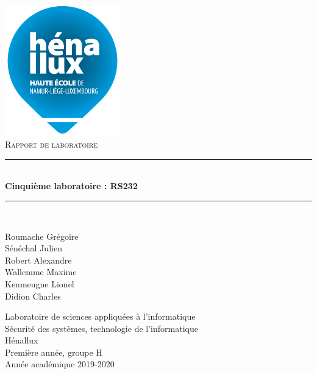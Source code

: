 \documentclass[a4paper]{article}
\newcommand{\HRule}{\rule{\linewidth}{0.5mm}}
\newcommand{\bgimg}[1]{
\AddToShipoutPicture
   {
      \put(\LenToUnit{0 cm},\LenToUnit{0 cm})
      {
            \texttt{[image: \#1]} 
      }
   }
}
\begin{document}

















\begin{titlepage}
    \begin{sffamily}
        \begin{center}
            \includegraphics[width=5cm]{images/LogoHenallux.PNG}~\\[1.5cm]
            \textsc{\Large Rapport de laboratoire}\\[1.5cm]

            \HRule \\[0.4cm]
            { \huge \bfseries Cinquième laboratoire : RS232\\[0.4cm] }
            \HRule \\[2cm]

            \begin{minipage}{0.4\textwidth}
                \begin{flushleft} \large
                    Roumache Grégoire\\
                    Sénéchal Julien\\
                    Robert Alexandre\\
                    Wallemme Maxime\\
                    Kenmeugne Lionel\\
                    Didion Charles
                \end{flushleft}
            \end{minipage}
            \begin{minipage}{0.55\textwidth}
                \begin{flushright} \large
                    Laboratoire de sciences appliquées à l'informatique\\
                    Sécurité des systèmes, technologie de l'informatique\\
                    Hénallux\\
                    Première année, groupe H \\
                    Année académique 2019-2020\\
                \end{flushright}
            \end{minipage}
            \vfill


\end{center}
\end{sffamily}
\end{titlepage}
\end{document}
